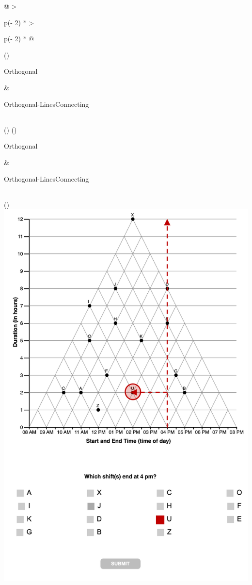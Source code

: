 \documentclass[
  letterpaper,
  DIV=11,
  numbers=noendperiod]{scrreprt}
\begin{document}
\begin{longtable}[]{@{}
  >{\raggedright\arraybackslash}p{(\columnwidth - 2\tabcolsep) * }
  >{\raggedright\arraybackslash}p{(\columnwidth - 2\tabcolsep) * }@{}}
\caption{TBL4 test}\tabularnewline
\toprule()
\begin{minipage}[b]{\linewidth}\raggedright
Orthogonal
\end{minipage} & \begin{minipage}[b]{\linewidth}\raggedright
Orthogonal-LinesConnecting
\end{minipage} \\
\midrule()
\endfirsthead
\toprule()
\begin{minipage}[b]{\linewidth}\raggedright
Orthogonal
\end{minipage} & \begin{minipage}[b]{\linewidth}\raggedright
Orthogonal-LinesConnecting
\end{minipage} \\
\midrule()
\endhead
\includegraphics{analysis/SGC3A/static/interpretations/Q4_111_ORTH.png}

\end{longtable}
\end{document}
